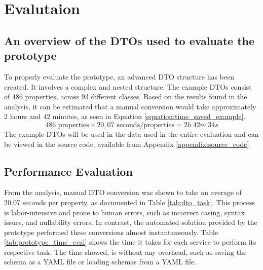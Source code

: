 \section{Evalutaion}

\subsection{An overview of the DTOs used to evaluate the prototype}
To properly evaluate the prototype, an advanced DTO structure has been created. It involves a complex and nested structure.
The example DTOs consist of 486 properties, across 93 different classes.
Based on the results found in the analysis, it can be estimated that a manual conversion would take approximately 2 hours and 42 minutes, as seen in Equation \ref{equation:time_saved_example}.
\begin{equation}
\label{equation:time_saved_example}
    486 \text{ properties} \times 20,07 \text{ seconds/properties} = 2h\ 42m\ 34s
\end{equation}
The example DTOs will be used in the data used in the entire evaluation and can be viewed in the source code, available from Appendix \ref{appendix:source_code}

\subsection{Performance Evaluation \label{sec:evaluation:performence_evaluation}}
From the analysis, manual DTO conversion was shown to take an average of 20.07 seconds per property, as documented in Table \ref{tab:dto_task}. This process is labor-intensive and prone to human errors, such as incorrect casing, syntax issues, and nullability errors. 
In contrast, the automated solution provided by the prototype performed these conversions almost instantaneously. 
Table \ref{tab:prototype_time_eval} shows the time it takes for each service to perform its respective task. The time showed, is without any overhead, such as saving the schema as a YAML file or loading schemas from a YAML file.

